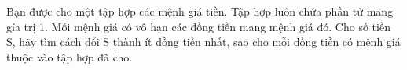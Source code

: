 Bạn được cho một tập hợp các mệnh giá tiền. Tập hợp luôn chứa phần tử mang gía trị 1. Mỗi mệnh giá có vô hạn các đồng tiền mang mệnh giá đó. Cho số tiền S, hãy tìm cách đổi S thành ít đồng tiền nhất, sao cho mỗi đồng tiền có mệnh giá thuộc vào tập hợp đã cho.